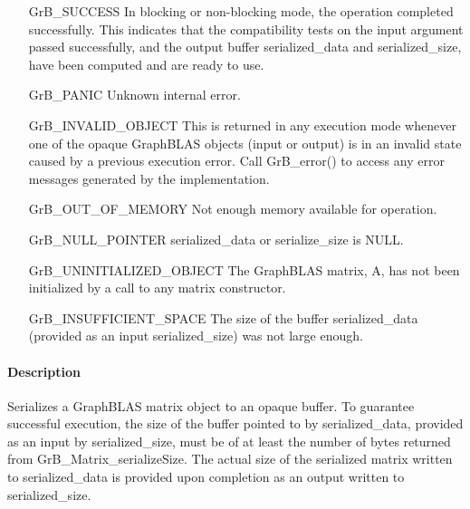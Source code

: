 \begin{itemize}[leftmargin=2.3in]
 
  \item[{\sf GrB\_SUCCESS}]  In blocking or non-blocking mode, the operation 
    completed successfully. This indicates that the compatibility tests on 
    the input argument passed successfully, and the output buffer {\sf serialized\_data}
    and {\sf serialized\_size}, have been computed and are ready to use.

    \item[{\sf GrB\_PANIC}]           Unknown internal error.
    
    \item[{\sf GrB\_INVALID\_OBJECT}] This is returned in any execution mode 
    whenever one of the opaque GraphBLAS objects (input or output) is in an invalid 
    state caused by a previous execution error.  Call {\sf GrB\_error()} to access 
    any error messages generated by the implementation.

    \item[{\sf GrB\_OUT\_OF\_MEMORY}] Not enough memory available for operation.
    
    \item[{\sf GrB\_NULL\_POINTER}]  {\sf serialized\_data} or {\sf serialize\_size} is {\sf NULL}.

    \item[{\sf GrB\_UNINITIALIZED\_OBJECT}]  The GraphBLAS matrix, {\sf A}, has 
    not been initialized by a call to any matrix constructor.

    \item[{\sf GrB\_INSUFFICIENT\_SPACE}]  The size of the buffer {\sf serialized\_data} (provided as an input {\sf serialized\_size}) was not large enough.
\end{itemize}

\paragraph{Description}

Serializes a GraphBLAS matrix object to an opaque buffer.  To guarantee
successful execution, the size of the buffer pointed to by {\sf serialized\_data},
provided as an input by {\sf serialized\_size}, must be of at least the number
of bytes returned from {\sf GrB\_Matrix\_serializeSize}.  The actual size of the
serialized matrix written to {\sf serialized\_data} is provided upon completion
as an output written to {\sf serialized\_size}.

